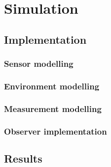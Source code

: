 \chapter{Simulation}
\section{Implementation}
\subsection{Sensor modelling}
\subsection{Environment modelling}
\subsection{Measurement modelling}
\subsection{Observer implementation}
\section{Results}